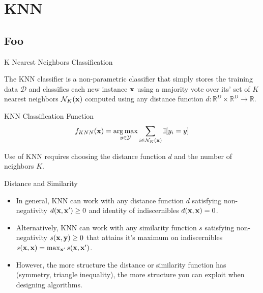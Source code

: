 \documentclass[serif,xcolor=pdftex,dvipsnames,table,hyperref={bookmarks=false}]{beamer}
\begin{document}
\section{KNN}
\subsection{Foo}
\begin{frame}[t]{K Nearest Neighbors Classification}

The KNN classifier is a non-parametric classifier that simply stores the training data $\mathcal{D}$
and classifies each new instance ${\mathbf{x}}$ using a majority vote over its' set of $K$ nearest neighbors $\mathcal{N}_K({\mathbf{x}})$ computed using any distance function $d:\mathbb{R}^D \times\mathbb{R}^D \rightarrow \mathbb{R} $.

\pause
\begin{block}{KNN Classification Function}
$$f_{KNN}({\mathbf{x}}) = \operatorname*{arg\,max}_{y\in\mathcal{Y}} \sum_{i\in \mathcal{N}_K({\mathbf{x}})} \mathbb{I}[y_i=y]$$
\end{block}

\pause Use of KNN requires choosing the distance function $d$ and the number of neighbors $K$.

\end{frame}

\begin{frame}[t]{Distance and Similarity}

\begin{itemize}
\item In general, KNN can work with any distance function $d$ satisfying non-negativity $d({\mathbf{x}},{\mathbf{x}}')\geq 0$ and identity of indiscernibles $d({\mathbf{x}},{\mathbf{x}})=0$.

\pause\item Alternatively, KNN can work with any similarity function $s$ satisfying non-negativity $s({\mathbf{x}},{\mathbf{y}})\geq 0$ that attains it's maximum on indiscernibles $s({\mathbf{x}},{\mathbf{x}})=\max_{{\mathbf{x}}'} s({\mathbf{x}},{\mathbf{x}}')$.

\pause\item However, the more structure the distance or similarity function has  (symmetry, triangle inequality), 
the more structure you can exploit when designing algorithms.

\end{itemize}

\end{frame}
\end{document}
